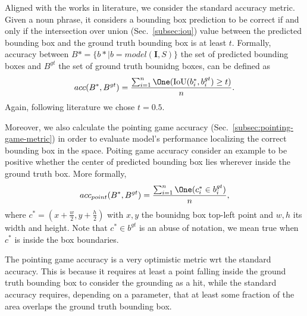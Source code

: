 Aligned with the works in literature, we consider the standard
accuracy metric. Given a noun phrase, it considers a bounding box
prediction to be correct if and only if the intersection over union
(Sec.~\ref{subsec:iou}) value between the predicted bounding box and
the ground truth bounding box is at least $t$. Formally, accuracy
between $B* = \{ b* | b = model(\bm{I}, S) \}$ the set of predicted
bounding boxes and $B^{gt}$ the set of ground truth bounidng boxes,
can be defined as
\[
  acc(B^*, B^{gt}) = \frac{\sum_{i = 1}^{n} \One (\iou (b_i^*, b_i^{gt}) \geq t)}{n}.
\]
Again, following literature we chose $t = 0.5$.

Moreover, we also calculate the pointing game accuracy
(Sec.~\ref{subsec:pointing-game-metric}) in order to evaluate model's
performance localizing the correct bounding box in the space. Poiting
game accuracy consider an example to be positive whether the center of
predicted bounding box lies wherever inside the ground truth box. More
formally,
\[
  acc_{point}(B^*, B^{gt}) = \frac{\sum_{i = 1}^{n} \One (c_i^* \in  b_i^{gt})}{n},
\]
where $c^* = (x + \frac{w}{2}, y + \frac{h}{2})$ with $x, y$ the
bounidng box top-left point and $w, h$ its width and height. Note that
$c^* \in b^{gt}$ is an abuse of notation, we mean true when $c^*$ is
inside the box boundaries.

The pointing game accuracy is a very optimistic metric wrt the
standard accuracy. This is because it requires at least a point
falling inside the ground truth bounding box to consider the grounding
as a hit, while the standard accuracy requires, depending on a
parameter, that at least some fraction of the area overlaps the ground
truth bounding box.
